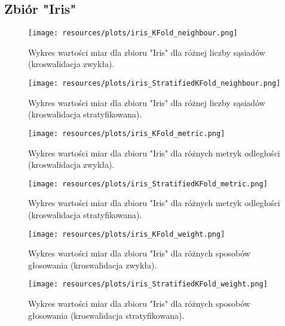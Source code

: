 \subsection{Zbiór "Iris"}
    \begin{figure}[H]
        \center
        \texttt{[image: resources/plots/iris\_KFold\_neighbour.png]}
        \caption{Wykres wartości miar dla zbioru "Iris" dla różnej liczby sąsiadów (kroswalidacja zwykła).}
    \end{figure}

    \begin{figure}[H]
        \center
        \texttt{[image: resources/plots/iris\_StratifiedKFold\_neighbour.png]}
        \caption{Wykres wartości miar dla zbioru "Iris" dla różnej liczby sąsiadów (kroswalidacja stratyfikowana).}
    \end{figure}

    
    

    \pagebreak

    \begin{figure}[H]
        \center
        \texttt{[image: resources/plots/iris\_KFold\_metric.png]}
        \caption{Wykres wartości miar dla zbioru "Iris" dla różnych metryk odległości (kroswalidacja zwykła).}
    \end{figure}

    \begin{figure}[H]
        \center
        \texttt{[image: resources/plots/iris\_StratifiedKFold\_metric.png]}
        \caption{Wykres wartości miar dla zbioru "Iris" dla różnych metryk odległości (kroswalidacja stratyfikowana).}
    \end{figure}

    
    

    \pagebreak

    \begin{figure}[H]
        \center
        \texttt{[image: resources/plots/iris\_KFold\_weight.png]}
        \caption{Wykres wartości miar dla zbioru "Iris" dla różnych sposobów głosowania (kroswalidacja zwykła).}
    \end{figure}

    \begin{figure}[H]
        \center
        \texttt{[image: resources/plots/iris\_StratifiedKFold\_weight.png]}
        \caption{Wykres wartości miar dla zbioru "Iris" dla różnych sposobów głosowania (kroswalidacja stratyfikowana).}
    \end{figure}

    
    